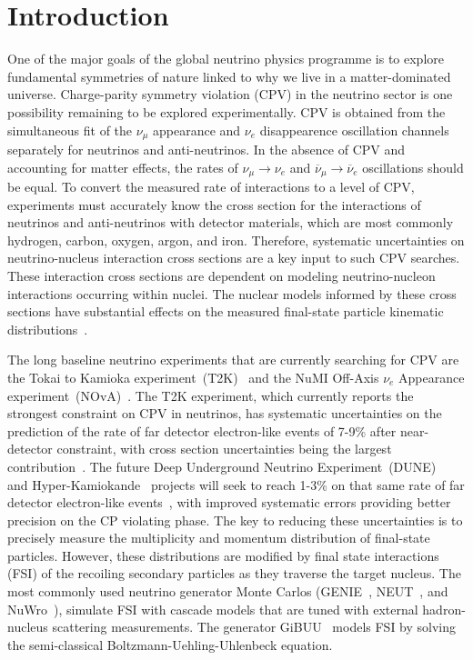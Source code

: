 \section{Introduction}
One of the major goals of the global neutrino physics programme is to explore fundamental symmetries of nature linked to why we live in a matter-dominated universe. 
Charge-parity symmetry violation (CPV) in the neutrino sector is one possibility remaining to be explored experimentally. 
CPV is obtained from the simultaneous fit of the $\nu_{\mu}$ appearance and $\nu_e$ disappearence oscillation channels separately for neutrinos and anti-neutrinos.
In the absence of CPV and accounting for matter effects, the rates of $\nu_{\mu}\!\rightarrow\!\nu_e$ and $\overline{\nu}_{\mu}\!\rightarrow\!\overline{\nu}_e$ oscillations should be equal.
To convert the measured rate of interactions to a level of CPV, experiments must accurately know the cross section for the interactions of neutrinos and anti-neutrinos with detector materials, which are most commonly hydrogen, carbon, oxygen, argon, and iron. 
Therefore, systematic uncertainties on neutrino-nucleus interaction cross sections are a key input to such CPV searches.  
These interaction cross sections are dependent on modeling neutrino-nucleon interactions occurring within nuclei. 
The nuclear models informed by these cross sections have substantial effects on the measured final-state particle kinematic distributions~\cite{Mosel:2016cwa}.

The long baseline neutrino experiments that are currently searching for CPV are the Tokai to Kamioka experiment~(T2K)~\cite{Abe:2019vii} and the NuMI Off-Axis $\nu_{e}$ Appearance experiment~(NOvA)~\cite{Acero:2019ksn}.
The T2K experiment, which currently reports the strongest constraint on CPV in neutrinos, has systematic uncertainties on the prediction of the rate of far detector electron-like events of 7-9\% after near-detector constraint, with cross section uncertainties being the largest contribution~\cite{Abe:2019vii}.
The future Deep Underground Neutrino Experiment~(DUNE)~\cite{abi2020deep} and Hyper-Kamiokande~\cite{abe2011letter} projects will seek to reach 1-3\% on that same rate of far detector electron-like events~\cite{acciarri2016long}, with improved systematic errors providing better precision on the CP violating phase.
The key to reducing these uncertainties is to precisely measure the multiplicity and momentum distribution of final-state particles. 
However, these distributions are modified by final state interactions (FSI) of the recoiling secondary particles as they traverse the target nucleus. 
The most commonly used neutrino generator Monte Carlos (GENIE~\cite{Andreopoulos:2009rq}, NEUT~\cite{Hayato:2009zz}, and NuWro~\cite{GOLAN2012499}), simulate FSI with cascade models that are tuned with external hadron-nucleus scattering measurements. The generator GiBUU~\cite{lalakulich2013neutrino} models FSI by solving the semi-classical Boltzmann-Uehling-Uhlenbeck equation.

